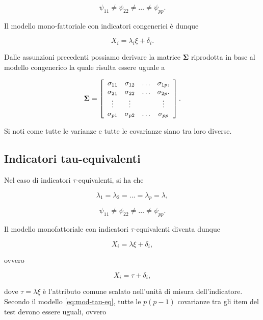\documentclass[
  11pt,
]{krantz}
\theoremstyle{definition}
\theoremstyle{definition}
\theoremstyle{definition}
\theoremstyle{definition}
\theoremstyle{remark}
\begin{document}
\[
\psi_{11}\neq \psi_{22} \neq \dots\neq \psi_{pp}.
\]

Il modello mono-fattoriale con indicatori congenerici è dunque

\begin{equation}
X_i = \lambda_i \xi + \delta_i.
\label{eq:mod-tau-eq}
\end{equation}

Dalle assunzioni precedenti possiamo derivare la matrice \(\boldsymbol{\Sigma}\) riprodotta in base al modello congenerico la quale risulta essere uguale a

\[
\boldsymbol{\Sigma}=\left[
      \begin{array}{ c c c c }
        \sigma_{11} & \sigma_{12} & \dots & \sigma_{1p}, \\
        \sigma_{21} & \sigma_{22} & \dots & \sigma_{2p}. \\
        \vdots & \vdots & & \vdots\\
        \sigma_{p1} & \sigma_{p2} & \dots & \sigma_{pp} 
      \end{array} 
    \right].
\]

Si noti come tutte le varianze e tutte le covarianze siano tra loro diverse.

\hypertarget{indicatori-tau-equivalenti}{%
\subsection{Indicatori tau-equivalenti}\label{indicatori-tau-equivalenti}}

Nel caso di indicatori \(\tau\)-equivalenti, si ha che

\[
\lambda_1=\lambda_2=\dots=\lambda_p=\lambda,
\]

\[
\psi_{11}\neq \psi_{22} \neq \dots\neq \psi_{pp}.
\]

Il modello monofattoriale con indicatori \(\tau\)-equivalenti diventa dunque

\begin{equation}
X_i = \lambda \xi + \delta_i, 
\label{eq:mod-tau-eq}
\end{equation}

ovvero

\begin{equation}
X_i = \tau + \delta_i,
\label{eq:mod-tau-eq-b}
\end{equation}

dove \(\tau=\lambda \xi\) è l'attributo comune scalato nell'unità di misura dell'indicatore. Secondo il modello \eqref{eq:mod-tau-eq}, tutte le \(p(p-1)\) covarianze tra gli item del test devono essere uguali, ovvero
\end{document}
